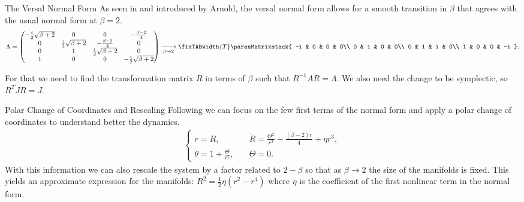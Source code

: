 \documentclass[final, leqno]{beamer}
\theoremstyle{plain}
\newlength{\colwidth}
\begin{document}
\begin{frame}[fragile, t]
\begin{columns}[t]
    \begin{column}{\colwidth}
\begin{block}{The Versal Normal Form}
As seen in \cite{schmidt1994versal} and introduced by Arnold, the versal normal form allows for a smooth transition in $\beta$ that agrees with the usual normal form at $\beta = 2$.
\vspace{1cm}
        $$
        \Lambda = \begin{pmatrix}
        -\frac{i}{2} \sqrt{\beta + 2} & 0 & 0 & -\frac{\beta - 2}{4}\\
        0 & \frac{i}{2} \sqrt{\beta + 2} & -\frac{\beta - 2}{4} & 0\\
        0 & 1 & \frac{i}{2} \sqrt{\beta + 2} & 0\\
        1 & 0 & 0 & -\frac{i}{2} \sqrt{\beta + 2}
        \end{pmatrix} \xrightarrow[\beta \to 2]{}
        \setstackgap{L}{1.1\baselineskip}
        \fixTABwidth{T}
        \parenMatrixstack{
        -i & 0 & 0 & 0\\
        0 & i & 0 & 0\\
        0 & 1 & i & 0\\
        1 & 0 & 0 & -i
        }.
        $$  

    For that we need to find the transformation matrix $R$ in terms of $\beta$ such that $R^{-1} A R = \Lambda$. We also need the change to be symplectic, so $R^{T}JR=J$.
    \end{block}

    \begin{block}{Polar Change of Coordinates and Rescaling}
        Following \cite{sokolskii1974stability} we can focus on the few first terms of the normal form and apply a polar change of coordinates to understand better the dynamics.
        \begin{align*}
        \begin{cases}
        \dot{r} = R, \qquad &\dot{R} = \frac{\Theta^2}{r^3}- \frac{(\beta - 2) r}{4} + \eta r^3,\\
        \dot{\theta} = 1 + \frac{\Theta}{r^2}, \quad &\dot{\Theta} = 0.
        \end{cases}
        \end{align*}
    With this information we can also rescale the system by a factor related to $2-\beta$ so that as $\beta \to 2$ the size of the manifolds is fixed. This yields an approximate expression for the manifolds: $R^2 = \frac{1}{2} \eta (r^2 - r^4)$ where $\eta$ is the coefficient of the first nonlinear term in the normal form.
    \end{block}
    \end{column}


\end{columns}
\end{frame}
\end{document}
